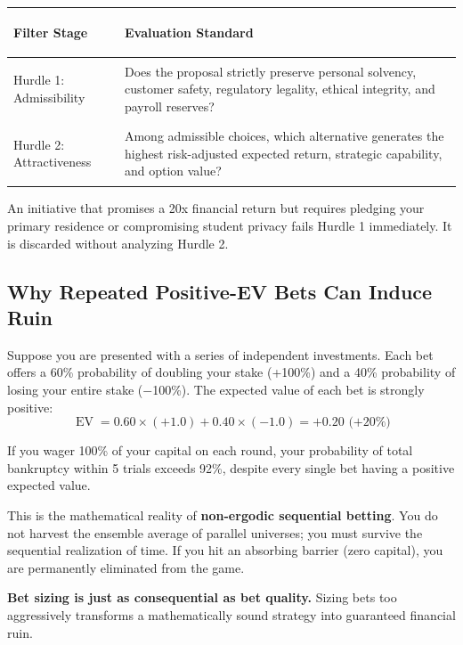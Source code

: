 \begin{tcolorbox}[
  enhanced,
  colback=BayesSurface!60,
  colframe=BayesBorder,
  boxrule=0.5pt,
  arc=3pt,
  left=3pt,right=3pt,top=3pt,bottom=3pt,
  boxsep=1pt
]
\scriptsize
\begin{tabularx}{\linewidth}{>{\bfseries\raggedright\arraybackslash}p{2.3cm} X}
\toprule
\textbf{Filter Stage} & \textbf{Evaluation Standard} \\
\midrule
Hurdle 1: Admissibility & Does the proposal strictly preserve personal solvency, customer safety, regulatory legality, ethical integrity, and payroll reserves? \\
\addlinespace[2pt]
Hurdle 2: Attractiveness & Among admissible choices, which alternative generates the highest risk-adjusted expected return, strategic capability, and option value? \\
\bottomrule
\end{tabularx}
\end{tcolorbox}

An initiative that promises a 20x financial return but requires pledging your primary residence or compromising student privacy fails Hurdle 1 immediately. It is discarded without analyzing Hurdle 2.

\subsection{Why Repeated Positive-EV Bets Can Induce Ruin}

Suppose you are presented with a series of independent investments. Each bet offers a 60\% probability of doubling your stake (+100\%) and a 40\% probability of losing your entire stake ($-$100\%). The expected value of each bet is strongly positive:
\begin{equation*}
\operatorname{EV} = 0.60 \times (+1.0) + 0.40 \times (-1.0) = +0.20 \text{ (+20\%)}
\end{equation*}

If you wager 100\% of your capital on each round, your probability of total bankruptcy within 5 trials exceeds 92\%, despite every single bet having a positive expected value.

This is the mathematical reality of \textbf{non-ergodic sequential betting}. You do not harvest the ensemble average of parallel universes; you must survive the sequential realization of time. If you hit an absorbing barrier (zero capital), you are permanently eliminated from the game.

\textbf{Bet sizing is just as consequential as bet quality.} Sizing bets too aggressively transforms a mathematically sound strategy into guaranteed financial ruin.

